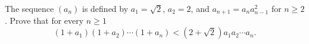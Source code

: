 The sequence $(a_n)$ is defined by $a_1=\sqrt{2}$,  $a_2=2$,  and $a_{n+1}=a_na_{n-1}^2$ for $n\ge 2$. Prove that for every $n\ge 1$\[(1+a_1)(1+a_2)\cdots (1+a_n)<(2+\sqrt{2})a_1a_2\cdots a_n. \]